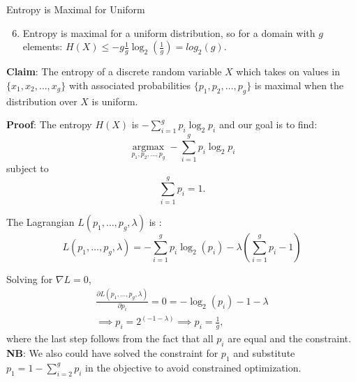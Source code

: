 \documentclass[11pt,compress,t,notes=noshow, xcolor=table]{beamer}
\begin{document}
\begin{vbframe}{Entropy is Maximal for Uniform}
\begin{enumerate}
\setcounter{enumi}{5}
\item Entropy is maximal for a uniform distribution, so for a domain with $g$ elements:  
      $H(X) \leq -g\frac{1}{g} \log_2(\frac{1}{g}) = log_2(g)$.
\end{enumerate}
\vspace{0.2cm}
\textbf{Claim}: The entropy of a discrete random variable $X$ which takes on values in $\{x_1,x_2, \ldots, x_g\}$ with associated probabilities $\{p_1,p_2, \ldots, p_g\}$ is maximal when the distribution over $X$ is uniform.

\lz
\textbf{Proof}: The entropy $H(X)$ is $- \sum_{i=1}^g p_i \log_2 p_i$ and our goal is to find:
  $$\underset{p_{1}, p_{2}, \ldots, p_{g}}{\operatorname{argmax}}-\sum_{i=1}^{g} p_{i} \log _{2} p_{i}$$
  subject to
  $$\sum_{i=1}^g p_i = 1.$$
  
  \framebreak
  The Lagrangian $L(p_1, \ldots, p_g, \lambda)$ is :
  $$L(p_1, \ldots, p_g, \lambda) = - \sum_{i=1}^g p_i \log_2(p_i) - \lambda \left( \sum_{i=1}^g p_i - 1 \right)$$
  
  Solving for $\nabla L = 0$,
  \begin{gather*}
    \frac{\partial L(p_1, \ldots, p_g, \lambda)}{\partial p_i} = 0 = - \log_2(p_i) - 1 - \lambda \\
    \implies p_i = 2^{(-1 - \lambda)} \implies p_i = \frac{1}{g},
  \end{gather*}
  where the last step follows from the fact that all $p_i$ are equal and the constraint.
  \vspace{0.2cm}\\
  \textbf{NB}: We also could have solved the constraint for $p_1$ and substitute $p_1=1-\sum_{i=2}^{g} p_i$ in the objective to avoid constrained optimization.

\end{vbframe}

\endlecture
\end{document}
